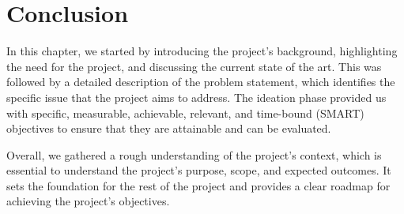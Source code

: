 \section*{Conclusion}

In this chapter, we started by introducing the project's background, highlighting the need for the project, and discussing the current state of the art. This was followed by a detailed description of the problem statement, which identifies the specific issue that the project aims to address. The ideation phase provided us with specific, measurable, achievable, relevant, and time-bound (SMART) objectives to ensure that they are attainable and can be evaluated. 

Overall, we gathered a rough understanding of the project's context, which is essential to understand the project's purpose, scope, and expected outcomes. It sets the foundation for the rest of the project and provides a clear roadmap for achieving the project's objectives.